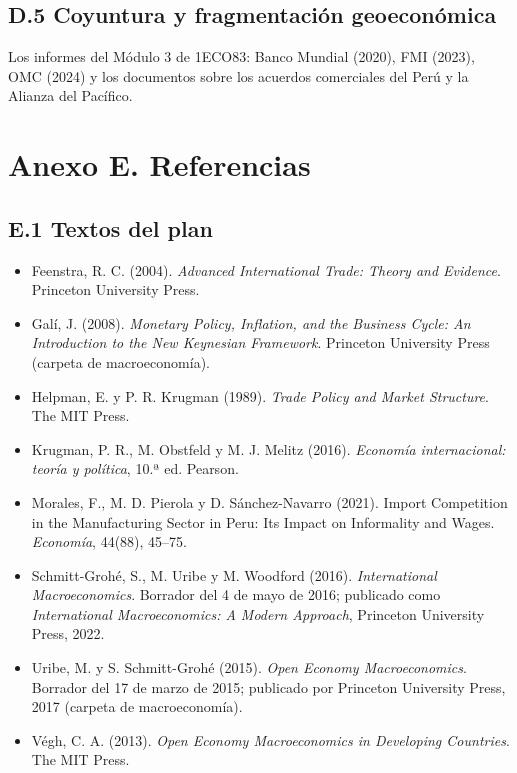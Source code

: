 \documentclass[11pt,a4paper]{article}
\begin{document}
\subsection*{D.5 Coyuntura y fragmentación geoeconómica}
Los informes del Módulo 3 de 1ECO83: Banco Mundial (2020), FMI (2023), OMC
(2024) y los documentos sobre los acuerdos comerciales del Perú y la Alianza
del Pacífico.

\section*{Anexo E. Referencias}

\subsection*{E.1 Textos del plan}
{\small
\begin{itemize}[leftmargin=1.4em,itemsep=1pt,label={}]
\item Feenstra, R. C. (2004). \emph{Advanced International Trade: Theory and Evidence}. Princeton University Press.
\item Galí, J. (2008). \emph{Monetary Policy, Inflation, and the Business Cycle: An Introduction to the New Keynesian Framework}. Princeton University Press (carpeta de macroeconomía).
\item Helpman, E. y P. R. Krugman (1989). \emph{Trade Policy and Market Structure}. The MIT Press.
\item Krugman, P. R., M. Obstfeld y M. J. Melitz (2016). \emph{Economía internacional: teoría y política}, 10.ª ed. Pearson.
\item Morales, F., M. D. Pierola y D. Sánchez-Navarro (2021). Import Competition in the Manufacturing Sector in Peru: Its Impact on Informality and Wages. \emph{Economía}, 44(88), 45--75.
\item Schmitt-Grohé, S., M. Uribe y M. Woodford (2016). \emph{International Macroeconomics}. Borrador del 4 de mayo de 2016; publicado como \emph{International Macroeconomics: A Modern Approach}, Princeton University Press, 2022.
\item Uribe, M. y S. Schmitt-Grohé (2015). \emph{Open Economy Macroeconomics}. Borrador del 17 de marzo de 2015; publicado por Princeton University Press, 2017 (carpeta de macroeconomía).
\item Végh, C. A. (2013). \emph{Open Economy Macroeconomics in Developing Countries}. The MIT Press.
\end{itemize}
}
\end{document}
